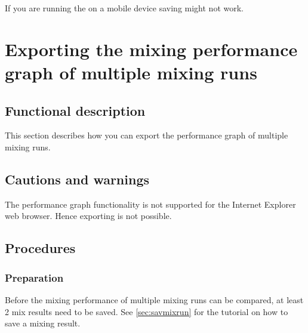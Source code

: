If you are running the \applicationname{} on a mobile device saving might not work.


\section{Exporting the mixing performance graph of multiple mixing runs}
\label{sec:exportMultiGraph}

\subsection{Functional description}
This section describes how you can export the performance graph of multiple mixing runs.

\subsection{Cautions and warnings}
The performance graph functionality is not supported for the Internet Explorer web browser. Hence exporting is not possible.

\subsection{Procedures}
\subsubsection{Preparation}
Before the mixing performance of multiple mixing runs can be compared, at least 2 mix results need to be saved. See \ref{sec:savmixrun} for the tutorial on how to save a mixing result.

